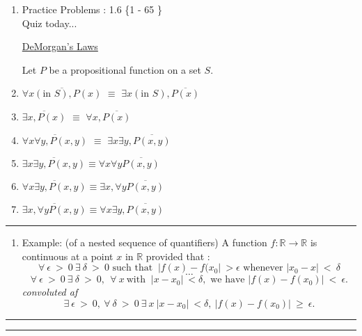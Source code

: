 \documentclass[10pt,letterpaper]{article}
\begin{document}
{

\begin{enumerate}
    \item[]
    Practice Problems : 1.6 \quad \{1 - 65 \} \\
    \/\/ Quiz today...
    \begin{center}
                
                \underline{DeMorgan's Laws} \vspace{.5em}
                
                Let $P$ be a propositional function on a set $S$.
    \end{center}
    \vspace{1.0em}
    \item $\overline{ \forall x ( \text{in } S ) , P(x)}$ $\equiv$ $\exists x (\text{in } S), \overline{P(x)}$
    \item $\overline{ \exists x, P(x) }$ $\equiv$ $\forall x, \overline{P(x)}$
    \item $\overline{\forall x \forall y , P(x,y)} $ $\equiv$ $\exists x \exists y , \overline{P(x,y)}$
    \item $\overline{\exists x \exists y, P(x,y)} \equiv \forall x \forall y \overline{P(x,y)}$
    \item $\overline{\forall x \exists y , P(x,y)} \equiv \exists x, \forall y \overline{P(x,y)}$
    \item $\overline{\exists x, \forall y P(x,y)} \equiv \forall x \exists y , \overline{P(x,y)}$
    \end{enumerate}
    \vspace{1.0em}
    \hrule{}
    \begin{enumerate}
        \item[] Example: (of a nested sequence of quantifiers) A function $f : \mathbb{R} \rightarrow{\mathbb{R}} $ is continuous at a point $x$ in $\mathbb{R}$ provided that :
        $$ \forall \ \epsilon \ > \ 0  \ \exists \ \delta  \ > \ 0 \text{ such that }  \ | f(x) - f(x_{0} | \ > \epsilon \text{ whenever } | x_{0} - x | \ < \ \delta $$
        $$\ldots$$
        $$ \forall \ \epsilon \ > \ 0 \ \exists \ \delta \ > \ 0 , \ \ \forall \ x \ \text{with } \ |x - x_{0} | \ < \delta , \text{ we have } | f(x) - f(x_{0}) | \ < \ \epsilon.$$ 
        \hfill \textit{convoluted af \\}
        $$ \exists \ \epsilon \ > \ 0, \ \forall \ \delta \ > \ 0 \ \exists \ x \ | x - x_{0} | \ < \delta , \ | f(x) - f(x_{0}) |  \ \geq \ \epsilon. $$
    \end{enumerate}
    \hrule{}\hrule{}
    
}
\end{document}
